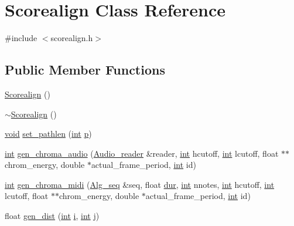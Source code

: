 \hypertarget{class_scorealign}{}\section{Scorealign Class Reference}
\label{class_scorealign}


{\ttfamily \#include $<$scorealign.\+h$>$}

\subsection*{Public Member Functions}
\begin{DoxyCompactItemize}
\item 
\hyperlink{class_scorealign_a845c4301b432386ed597b1a4586d7621}{Scorealign} ()
\item 
\hyperlink{class_scorealign_a154311d8899664e1b8437ec9ff71ef6c}{$\sim$\+Scorealign} ()
\item 
\hyperlink{sound_8c_ae35f5844602719cf66324f4de2a658b3}{void} \hyperlink{class_scorealign_a93b4274da379f36e29f0fa84eb2887eb}{set\+\_\+pathlen} (\hyperlink{xmltok_8h_a5a0d4a5641ce434f1d23533f2b2e6653}{int} \hyperlink{xmltok_8h_a94b60f3beb36ae85555d36dc9816769c}{p})
\item 
\hyperlink{xmltok_8h_a5a0d4a5641ce434f1d23533f2b2e6653}{int} \hyperlink{class_scorealign_a321aa0e85c1b8d97158ad1eebe0f29d0}{gen\+\_\+chroma\+\_\+audio} (\hyperlink{class_audio__reader}{Audio\+\_\+reader} \&reader, \hyperlink{xmltok_8h_a5a0d4a5641ce434f1d23533f2b2e6653}{int} hcutoff, \hyperlink{xmltok_8h_a5a0d4a5641ce434f1d23533f2b2e6653}{int} lcutoff, float $\ast$$\ast$chrom\+\_\+energy, double $\ast$actual\+\_\+frame\+\_\+period, \hyperlink{xmltok_8h_a5a0d4a5641ce434f1d23533f2b2e6653}{int} id)
\item 
\hyperlink{xmltok_8h_a5a0d4a5641ce434f1d23533f2b2e6653}{int} \hyperlink{class_scorealign_a3e123c40feefe620c0e830ef9380baa1}{gen\+\_\+chroma\+\_\+midi} (\hyperlink{class_alg__seq}{Alg\+\_\+seq} \&seq, float \hyperlink{seqread_8c_a3c79b5a9ee81c3835b8de9b0d900d2de}{dur}, \hyperlink{xmltok_8h_a5a0d4a5641ce434f1d23533f2b2e6653}{int} nnotes, \hyperlink{xmltok_8h_a5a0d4a5641ce434f1d23533f2b2e6653}{int} hcutoff, \hyperlink{xmltok_8h_a5a0d4a5641ce434f1d23533f2b2e6653}{int} lcutoff, float $\ast$$\ast$chrom\+\_\+energy, double $\ast$actual\+\_\+frame\+\_\+period, \hyperlink{xmltok_8h_a5a0d4a5641ce434f1d23533f2b2e6653}{int} id)
\item 
float \hyperlink{class_scorealign_a626ed8876bafc5bbf5c86db23864c942}{gen\+\_\+dist} (\hyperlink{xmltok_8h_a5a0d4a5641ce434f1d23533f2b2e6653}{int} \hyperlink{checksum_8c_ab80e330a3bc9e38c1297fe17381e92b4}{i}, \hyperlink{xmltok_8h_a5a0d4a5641ce434f1d23533f2b2e6653}{int} j)

\end{DoxyCompactItemize}
